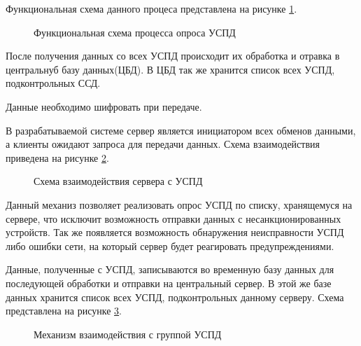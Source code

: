 Функциональная схема данного процеса представлена на рисунке \ref{img:main_idef0}.

\begin{figure}[!Ht]
 \caption{Функциональная схема процесса опроса УСПД}
 \label{img:main_idef0}
\end{figure}

После получения данных со всех УСПД происходит их обработка и отравка в центральнуб базу данных(ЦБД). В ЦБД так же хранится список всех УСПД, подконтрольных ССД.

Данные необходимо шифровать при передаче.

В разрабатываемой системе сервер является инициатором всех обменов данными, а клиенты ожидают запроса для передачи данных. Схема взаимодействия приведена на рисунке \ref{scheme2:scheme2}.

\begin{figure}[!ht]
 \caption{Схема взаимодействия сервера с УСПД}
 \label{scheme2:scheme2}
\end{figure}

Данный механиз позволяет реализовать опрос УСПД по списку, хранящемуся на сервере, что исключит возможность отправки данных с несанкционированных устройств. Так же появляется возможность обнаружения неисправности УСПД либо ошибки сети, на который сервер будет реагировать предупреждениями. 

Данные, полученные с УСПД, записываются во временную базу данных для последующей обработки и отправки на центральный сервер. В этой же базе данных хранится список всех УСПД, подконтрольных данному серверу. Схема представлена на рисунке \ref{scheme3:scheme3}.

\begin{figure}[!ht]
 \caption{Механизм взаимодействия с группой УСПД}
 \label{scheme3:scheme3}
\end{figure}


